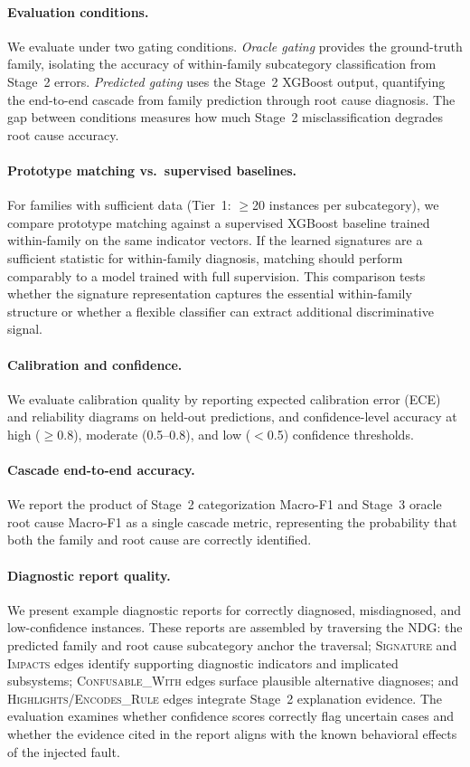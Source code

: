 \paragraph{Evaluation conditions.}
We evaluate under two gating conditions. \emph{Oracle gating} provides the ground-truth family, isolating the accuracy of within-family subcategory classification from Stage~2 errors. \emph{Predicted gating} uses the Stage~2 XGBoost output, quantifying the end-to-end cascade from family prediction through root cause diagnosis. The gap between conditions measures how much Stage~2 misclassification degrades root cause accuracy.

\paragraph{Prototype matching vs.\ supervised baselines.}
For families with sufficient data (Tier~1: $\geq$20 instances per subcategory), we compare prototype matching against a supervised XGBoost baseline trained within-family on the same indicator vectors. If the learned signatures are a sufficient statistic for within-family diagnosis, matching should perform comparably to a model trained with full supervision. This comparison tests whether the signature representation captures the essential within-family structure or whether a flexible classifier can extract additional discriminative signal.

\paragraph{Calibration and confidence.}
We evaluate calibration quality by reporting expected calibration error (ECE) and reliability diagrams on held-out predictions, and confidence-level accuracy at high ($\geq$0.8), moderate (0.5--0.8), and low ($<$0.5) confidence thresholds.

\paragraph{Cascade end-to-end accuracy.}
We report the product of Stage~2 categorization Macro-F1 and Stage~3 oracle root cause Macro-F1 as a single cascade metric, representing the probability that both the family and root cause are correctly identified.

\paragraph{Diagnostic report quality.}
We present example diagnostic reports for correctly diagnosed, misdiagnosed, and low-confidence instances. These reports are assembled by traversing the NDG: the predicted family and root cause subcategory anchor the traversal; \textsc{Signature} and \textsc{Impacts} edges identify supporting diagnostic indicators and implicated subsystems; \textsc{Confusable\_With} edges surface plausible alternative diagnoses; and \textsc{Highlights}/\textsc{Encodes\_Rule} edges integrate Stage~2 explanation evidence. The evaluation examines whether confidence scores correctly flag uncertain cases and whether the evidence cited in the report aligns with the known behavioral effects of the injected fault.

